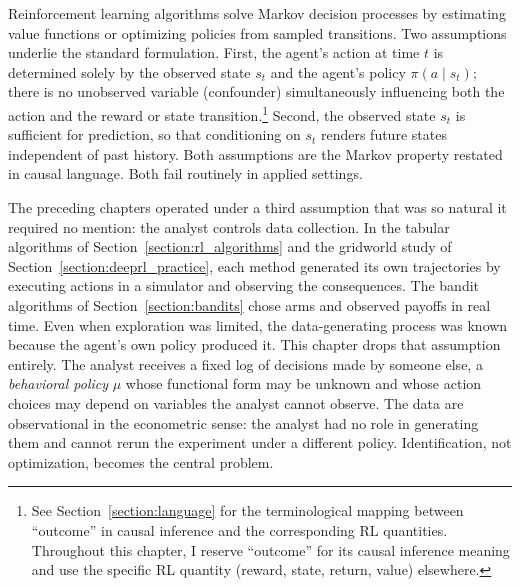 %

Reinforcement learning algorithms solve Markov decision processes by estimating value functions or optimizing policies from sampled transitions. Two assumptions underlie the standard formulation. First, the agent's action at time $t$ is determined solely by the observed state $s_t$ and the agent's policy $\pi(a \mid s_t)$; there is no unobserved variable (confounder) simultaneously influencing both the action and the reward or state transition.\footnote{See Section~\ref{section:language} for the terminological mapping between ``outcome'' in causal inference and the corresponding RL quantities. Throughout this chapter, I reserve ``outcome'' for its causal inference meaning and use the specific RL quantity (reward, state, return, value) elsewhere.}
Second, the observed state $s_t$ is sufficient for prediction, so that conditioning on $s_t$ renders future states independent of past history. Both assumptions are the Markov property restated in causal language. Both fail routinely in applied settings.

The preceding chapters operated under a third assumption that was so natural it required no mention: the analyst controls data collection. In the tabular algorithms of Section~\ref{section:rl_algorithms} and the gridworld study of Section~\ref{section:deeprl_practice}, each method generated its own trajectories by executing actions in a simulator and observing the consequences. The bandit algorithms of Section~\ref{section:bandits} chose arms and observed payoffs in real time. Even when exploration was limited, the data-generating process was known because the agent's own policy produced it. This chapter drops that assumption entirely. The analyst receives a fixed log of decisions made by someone else, a \textit{behavioral policy} $\mu$ whose functional form may be unknown and whose action choices may depend on variables the analyst cannot observe. The data are observational in the econometric sense: the analyst had no role in generating them and cannot rerun the experiment under a different policy. Identification, not optimization, becomes the central problem.

